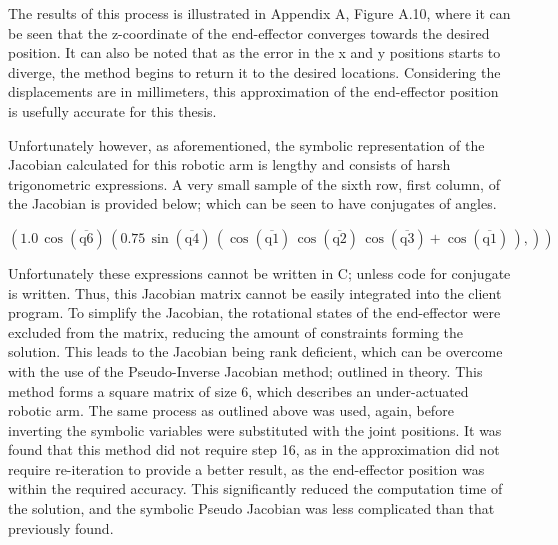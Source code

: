 \documentclass[12pt,openany,a4paper]{book}
\begin{document}
The results of this process is illustrated in Appendix A, Figure A.10, where it can be seen that the z-coordinate of the end-effector converges towards the desired position. It can also be noted that as the error in the x and y positions starts to diverge, the method begins to return it to the desired locations. Considering the displacements are in millimeters, this approximation of the end-effector position is usefully accurate for this thesis.



Unfortunately however, as aforementioned, the symbolic representation of the Jacobian calculated for this robotic arm is lengthy and consists of harsh trigonometric expressions. A very small sample of the sixth row, first column, of the Jacobian is provided below; which can be seen to have conjugates of angles.

\begin{center}
$\left(1.0\, \cos\!\left(\overline{\mathrm{q6}}\right)\, \left(0.75\, \sin\!\left(\overline{\mathrm{q4}}\right)\, \left(\cos\!\left(\overline{\mathrm{q1}}\right)\, \cos\!\left(\overline{\mathrm{q2}}\right)\, \cos\!\left(\overline{\mathrm{q3}}\right) + \cos\!\left(\overline{\mathrm{q1}}\right)\, \right),\right)\right)$
\end{center}


Unfortunately these expressions cannot be written in C; unless code for conjugate is written. Thus, this Jacobian matrix cannot be easily integrated into the client program. To simplify the Jacobian, the rotational states of the end-effector were excluded from the matrix, reducing the amount of constraints forming the solution. This leads to the Jacobian being rank deficient, which can be overcome with the use of the Pseudo-Inverse Jacobian method; outlined in theory. This method forms a square matrix of size 6, which describes an under-actuated robotic arm. The same process as outlined above was used, again, before inverting the symbolic variables were substituted with the joint positions. It was found that this method did not require step 16, as in the approximation did not require re-iteration to provide a better result, as the end-effector position was within the required accuracy. This significantly reduced the computation time of the solution, and the symbolic Pseudo Jacobian was less complicated than that previously found.
\end{document}

